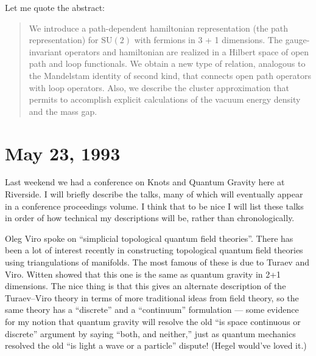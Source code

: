 \documentclass{article}
\begin{document}
Let me quote the abstract:

\begin{quote}
We introduce a path-dependent hamiltonian representation (the path
representation) for \(\mathrm{SU}(2)\) with fermions in 3 + 1
dimensions. The gauge-invariant operators and hamiltonian are realized
in a Hilbert space of open path and loop functionals. We obtain a new
type of relation, analogous to the Mandelstam identity of second kind,
that connects open path operators with loop operators. Also, we describe
the cluster approximation that permits to accomplish explicit
calculations of the vacuum energy density and the mass gap.
\end{quote}



\hypertarget{week15}{%
\section{May 23, 1993}\label{week15}}

Last weekend we had a conference on Knots and Quantum Gravity here at
Riverside. I will briefly describe the talks, many of which will
eventually appear in a conference proceedings volume. I think that to be
nice I will list these talks in order of how technical my descriptions
will be, rather than chronologically.

Oleg Viro spoke on ``simplicial topological quantum field theories''.
There has been a lot of interest recently in constructing topological
quantum field theories using triangulations of manifolds. The most
famous of these is due to Turaev and Viro. Witten showed that this one
is the same as quantum gravity in 2+1 dimensions. The nice thing is that
this gives an alternate description of the Turaev--Viro theory in terms
of more traditional ideas from field theory, so the same theory has a
``discrete'' and a ``continuum'' formulation --- some evidence for my
notion that quantum gravity will resolve the old ``is space continuous
or discrete'' argument by saying ``both, and neither,'' just as quantum
mechanics resolved the old ``is light a wave or a particle'' dispute!
(Hegel would've loved it.)
\end{document}
